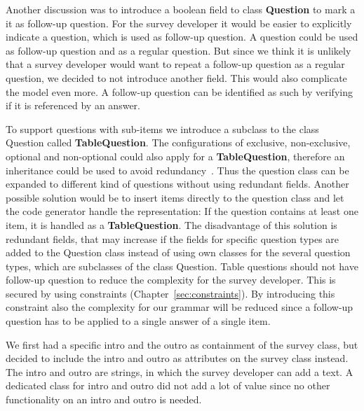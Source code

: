 \documentclass[runningheads,a4paper]{llncs}
\begin{document}
Another discussion was to introduce a boolean field to class \textbf{Question} to mark a it as follow-up question. For the survey developer it would be easier to explicitly indicate a question, which is used as follow-up question. A question could be used as follow-up question and as a regular question. But since we think it is unlikely that a survey developer would want to repeat a follow-up question as a regular question, we decided to not introduce another field. This would also complicate the model even more. A follow-up question can be identified as such by verifying if it is referenced by an answer.

\label{par:table_questions}
To support questions with sub-items we introduce a subclass to the class Question called \textbf{TableQuestion}. The configurations of exclusive, non-exclusive, optional and non-optional could also apply for a \textbf{TableQuestion}, therefore an inheritance could be used to avoid redundancy~\cite{karsai}. Thus the question class can be expanded to different kind of questions without using redundant fields. Another possible solution would be to insert items directly to the question class and let the code generator handle the representation: If the question contains at least one item, it is handled as a \textbf{TableQuestion}. The disadvantage of this solution is redundant fields, that may increase if the fields for specific question types are added to the Question class instead of using own classes for the several question types, which are subclasses of the class Question. Table questions should not have follow-up question to reduce the complexity for the survey developer. This is secured by using constraints (Chapter~\ref{sec:constraints}). By introducing this constraint also the complexity for our grammar will be reduced since a follow-up question has to be applied to a single answer of a single item.

We first had a specific intro and the outro as containment of the survey class, but decided to include the intro and outro as attributes on the survey class instead. The intro and outro are strings, in which the survey developer can add a text. A dedicated class for intro and outro did not add a lot of value since no other functionality on an intro and outro is needed.
\end{document}
